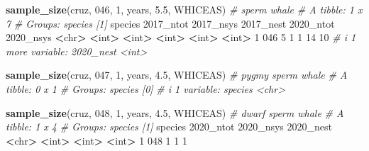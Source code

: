 \documentclass[
]{book}
\newenvironment{Shaded}{\begin{snugshade}}{\end{snugshade}}
\newcommand{\AttributeTok}[1]{\textcolor[rgb]{0.13,0.29,0.53}{#1}}
\newcommand{\CommentTok}[1]{\textcolor[rgb]{0.56,0.35,0.01}{\textit{#1}}}
\newcommand{\DecValTok}[1]{\textcolor[rgb]{0.00,0.00,0.81}{#1}}
\newcommand{\ErrorTok}[1]{\textcolor[rgb]{0.64,0.00,0.00}{\textbf{#1}}}
\newcommand{\FloatTok}[1]{\textcolor[rgb]{0.00,0.00,0.81}{#1}}
\newcommand{\FunctionTok}[1]{\textcolor[rgb]{0.13,0.29,0.53}{\textbf{#1}}}
\newcommand{\NormalTok}[1]{#1}
\newcommand{\SpecialCharTok}[1]{\textcolor[rgb]{0.81,0.36,0.00}{\textbf{#1}}}
\newcommand{\StringTok}[1]{\textcolor[rgb]{0.31,0.60,0.02}{#1}}
\begin{document}
\begin{Shaded}
\begin{Highlighting}[]
\FunctionTok{sample\_size}\NormalTok{(cruz, }\StringTok{\textquotesingle{}046\textquotesingle{}}\NormalTok{, }\DecValTok{1}\NormalTok{, years, }\FloatTok{5.5}\NormalTok{, }\StringTok{\textquotesingle{}WHICEAS\textquotesingle{}}\NormalTok{) }\CommentTok{\# sperm whale}
\CommentTok{\# A tibble: 1 x 7}
\CommentTok{\# Groups:   species [1]}
\NormalTok{  species }\StringTok{\textasciigrave{}}\AttributeTok{2017\_ntot}\StringTok{\textasciigrave{}} \StringTok{\textasciigrave{}}\AttributeTok{2017\_nsys}\StringTok{\textasciigrave{}} \StringTok{\textasciigrave{}}\AttributeTok{2017\_nest}\StringTok{\textasciigrave{}} \StringTok{\textasciigrave{}}\AttributeTok{2020\_ntot}\StringTok{\textasciigrave{}} \StringTok{\textasciigrave{}}\AttributeTok{2020\_nsys}\StringTok{\textasciigrave{}}
  \SpecialCharTok{\textless{}}\NormalTok{chr}\SpecialCharTok{\textgreater{}}         \ErrorTok{\textless{}}\NormalTok{int}\SpecialCharTok{\textgreater{}}       \ErrorTok{\textless{}}\NormalTok{int}\SpecialCharTok{\textgreater{}}       \ErrorTok{\textless{}}\NormalTok{int}\SpecialCharTok{\textgreater{}}       \ErrorTok{\textless{}}\NormalTok{int}\SpecialCharTok{\textgreater{}}       \ErrorTok{\textless{}}\NormalTok{int}\SpecialCharTok{\textgreater{}}
\DecValTok{1} \DecValTok{046}               \DecValTok{5}           \DecValTok{1}           \DecValTok{1}          \DecValTok{14}          \DecValTok{10}
\CommentTok{\# i 1 more variable: \textasciigrave{}2020\_nest\textasciigrave{} \textless{}int\textgreater{}}

\FunctionTok{sample\_size}\NormalTok{(cruz, }\StringTok{\textquotesingle{}047\textquotesingle{}}\NormalTok{, }\DecValTok{1}\NormalTok{, years, }\FloatTok{4.5}\NormalTok{, }\StringTok{\textquotesingle{}WHICEAS\textquotesingle{}}\NormalTok{) }\CommentTok{\# pygmy sperm whale}
\CommentTok{\# A tibble: 0 x 1}
\CommentTok{\# Groups:   species [0]}
\CommentTok{\# i 1 variable: species \textless{}chr\textgreater{}}

\FunctionTok{sample\_size}\NormalTok{(cruz, }\StringTok{\textquotesingle{}048\textquotesingle{}}\NormalTok{, }\DecValTok{1}\NormalTok{, years, }\FloatTok{4.5}\NormalTok{, }\StringTok{\textquotesingle{}WHICEAS\textquotesingle{}}\NormalTok{) }\CommentTok{\# dwarf sperm whale}
\CommentTok{\# A tibble: 1 x 4}
\CommentTok{\# Groups:   species [1]}
\NormalTok{  species }\StringTok{\textasciigrave{}}\AttributeTok{2020\_ntot}\StringTok{\textasciigrave{}} \StringTok{\textasciigrave{}}\AttributeTok{2020\_nsys}\StringTok{\textasciigrave{}} \StringTok{\textasciigrave{}}\AttributeTok{2020\_nest}\StringTok{\textasciigrave{}}
  \SpecialCharTok{\textless{}}\NormalTok{chr}\SpecialCharTok{\textgreater{}}         \ErrorTok{\textless{}}\NormalTok{int}\SpecialCharTok{\textgreater{}}       \ErrorTok{\textless{}}\NormalTok{int}\SpecialCharTok{\textgreater{}}       \ErrorTok{\textless{}}\NormalTok{int}\SpecialCharTok{\textgreater{}}
\DecValTok{1} \DecValTok{048}               \DecValTok{1}           \DecValTok{1}           \DecValTok{1}


\end{Highlighting}
\end{Shaded}
\end{document}
